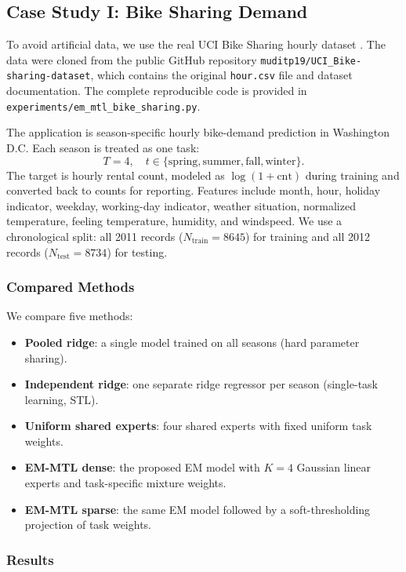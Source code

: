 \documentclass[preprint,12pt]{elsarticle}
\begin{document}
	\subsection{Case Study I: Bike Sharing Demand}
	
	To avoid artificial data, we use the real UCI Bike Sharing hourly
	dataset \citep{fanaee2013event}. The data were cloned from the public
	GitHub repository \texttt{muditp19/UCI\_Bike-sharing-dataset}, which
	contains the original \texttt{hour.csv} file and dataset documentation.
	The complete reproducible code is provided in
	\texttt{experiments/em\_mtl\_bike\_sharing.py}.
	
	The application is season-specific hourly bike-demand prediction in
	Washington D.C. Each season is treated as one task:
	\[
	T=4,\quad
	t\in\{\mathrm{spring},\mathrm{summer},\mathrm{fall},\mathrm{winter}\}.
	\]
	The target is hourly rental count, modeled as $\log(1+\mathrm{cnt})$
	during training and converted back to counts for reporting. Features
	include month, hour, holiday indicator, weekday, working-day indicator,
	weather situation, normalized temperature, feeling temperature, humidity,
	and windspeed. We use a chronological split: all 2011 records
	($N_{\mathrm{train}}=8645$) for training and all 2012 records
	($N_{\mathrm{test}}=8734$) for testing.
	
	\subsubsection{Compared Methods}
	
	We compare five methods:
	\begin{itemize}
		\item \textbf{Pooled ridge}: a single model trained on all seasons
		(hard parameter sharing).
		\item \textbf{Independent ridge}: one separate ridge regressor per
		season (single-task learning, STL).
		\item \textbf{Uniform shared experts}: four shared experts with fixed
		uniform task weights.
		\item \textbf{EM-MTL dense}: the proposed EM model with $K=4$
		Gaussian linear experts and task-specific mixture weights.
		\item \textbf{EM-MTL sparse}: the same EM model followed by a
		soft-thresholding projection of task weights.
	\end{itemize}
	
	\subsubsection{Results}
	
\end{document}
